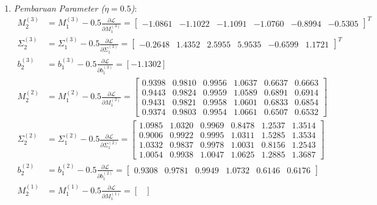 \documentclass[11pt,a4paper]{article}
\def\mathbf#1{#1}%
\theoremstyle{plain}
\theoremstyle{definition}
\theoremstyle{remark}
\begin{document}
\begin{enumerate}
    \item \textit{Pembaruan Parameter ($\eta = 0.5$)}:
    \begin{align}
        M^{(3)}_2 &= M^{(3)}_1 - 0.5 \frac{\partial \mathcal{L}}{\partial M^{(3)}_1} = \begin{bmatrix} -1.0861 & -1.1022 & -1.1091 & -1.0760 & -0.8994 & -0.5305 \end{bmatrix}^T \\[0.2em]
        \Sigma^{(3)}_2 &= \Sigma^{(3)}_1 - 0.5 \frac{\partial \mathcal{L}}{\partial \Sigma^{(3)}_1} = \begin{bmatrix} -0.2648 & 1.4352 & 2.5955 & 5.9535 & -0.6599 & 1.1721 \end{bmatrix}^T \\[0.2em]
        \mathbf{b}^{(3)}_2 &= \mathbf{b}^{(3)}_1 - 0.5 \frac{\partial \mathcal{L}}{\partial \mathbf{b}^{(3)}_1} = [-1.1302] \\[0.2em]
        M^{(2)}_2 &= M^{(2)}_1 - 0.5 \frac{\partial \mathcal{L}}{\partial M^{(2)}_1} = \begin{bmatrix}
            0.9398 & 0.9810 & 0.9956 & 1.0637 & 0.6637 & 0.6663 \\
            0.9443 & 0.9824 & 0.9959 & 1.0589 & 0.6891 & 0.6914 \\
            0.9431 & 0.9821 & 0.9958 & 1.0601 & 0.6833 & 0.6854 \\
            0.9374 & 0.9803 & 0.9954 & 1.0661 & 0.6507 & 0.6532
        \end{bmatrix} \\[0.2em]
        \Sigma^{(2)}_2 &= \Sigma^{(2)}_1 - 0.5 \frac{\partial \mathcal{L}}{\partial \Sigma^{(2)}_1} = \begin{bmatrix}
            1.0985 & 1.0320 & 0.9969 & 0.8478 & 1.2537 & 1.3514 \\
            0.9006 & 0.9922 & 0.9995 & 1.0311 & 1.5285 & 1.3534 \\
            1.0332 & 0.9837 & 0.9978 & 1.0031 & 0.8156 & 1.2543 \\
            1.0054 & 0.9938 & 1.0047 & 1.0625 & 1.2885 & 1.3687
        \end{bmatrix} \\[0.2em]
        \mathbf{b}^{(2)}_2 &= \mathbf{b}^{(2)}_1 - 0.5 \frac{\partial \mathcal{L}}{\partial \mathbf{b}^{(2)}_1} = \begin{bmatrix} 0.9308 & 0.9781 & 0.9949 & 1.0732 & 0.6146 & 0.6176 \end{bmatrix} \\[0.2em]
        M^{(1)}_2 &= M^{(1)}_1 - 0.5 \frac{\partial \mathcal{L}}{\partial M^{(1)}_1} = \begin{bmatrix}

\end{bmatrix}
\end{align}
\end{enumerate}
\end{document}
